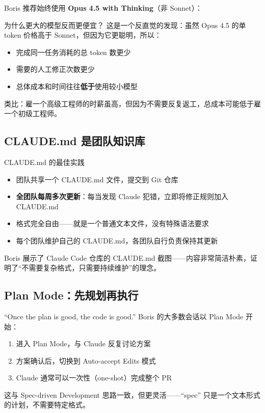 \documentclass[a4paper]{article}
\begin{document}
Boris 推荐始终使用 \textbf{Opus 4.5 with Thinking}（非 Sonnet）：

\begin{knowledgebox}{为什么更大的模型反而更便宜？}
这是一个反直觉的发现：虽然 Opus 4.5 的单 token 价格高于 Sonnet，但因为它更聪明，所以：
\begin{itemize}
    \item 完成同一任务消耗的总 token 数更少
    \item 需要的人工修正次数更少
    \item 总体成本和时间往往\textbf{低于}使用较小模型
\end{itemize}
类比：雇一个高级工程师的时薪虽高，但因为不需要反复返工，总成本可能低于雇一个初级工程师。
\end{knowledgebox}

\subsection{CLAUDE.md 是团队知识库}

\begin{importantbox}{CLAUDE.md 的最佳实践}
\begin{itemize}
    \item 团队共享一个 CLAUDE.md 文件，提交到 Git 仓库
    \item \textbf{全团队每周多次更新}：每当发现 Claude 犯错，立即将修正规则加入 CLAUDE.md
    \item 格式完全自由——就是一个普通文本文件，没有特殊语法要求
    \item 每个团队维护自己的 CLAUDE.md，各团队自行负责保持其更新
\end{itemize}
\end{importantbox}

Boris 展示了 Claude Code 仓库的 CLAUDE.md 截图——内容非常简洁朴素，证明了``不需要复杂格式，只需要持续维护''的理念。

\subsection{Plan Mode：先规划再执行}

\begin{importantbox}{``Once the plan is good, the code is good.''}
Boris 的大多数会话以 Plan Mode 开始：
\begin{enumerate}
    \item 进入 Plan Mode，与 Claude 反复讨论方案
    \item 方案确认后，切换到 Auto-accept Edits 模式
    \item Claude 通常可以一次性（one-shot）完成整个 PR
\end{enumerate}
这与 Spec-driven Development 思路一致，但更灵活——``spec'' 只是一个文本形式的计划，不需要特定格式。
\end{importantbox}
\end{document}
